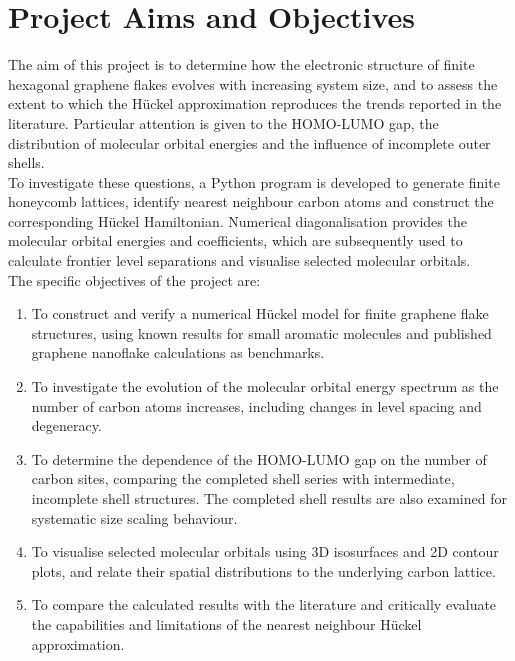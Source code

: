 \section{Project Aims and Objectives}
\label{sec:project_objectives}

\noindent The aim of this project is to determine how the electronic structure of finite hexagonal graphene flakes evolves with increasing system size, and to assess the extent to which the H\"uckel approximation reproduces the trends reported in the literature. Particular attention is given to the HOMO-LUMO gap, the distribution of molecular orbital energies and the influence of incomplete outer shells. \\

\noindent To investigate these questions, a Python program is developed to generate finite honeycomb lattices, identify nearest neighbour carbon atoms and construct the corresponding H\"uckel Hamiltonian. Numerical diagonalisation provides the molecular orbital energies and coefficients, which are subsequently used to calculate frontier level separations and visualise selected molecular orbitals. \\

\noindent The specific objectives of the project are:

\begin{enumerate}

    \item To construct and verify a numerical H\"uckel model for finite graphene flake structures, using known results for small aromatic molecules and published graphene nanoflake calculations as benchmarks.

    \item To investigate the evolution of the molecular orbital energy spectrum as the number of carbon atoms increases, including changes in level spacing and degeneracy.

    \item To determine the dependence of the HOMO-LUMO gap on the number of carbon sites, comparing the completed shell series with intermediate, incomplete shell structures. The completed shell results are also examined for systematic size scaling behaviour.

    \item To visualise selected molecular orbitals using 3D isosurfaces and 2D contour plots, and relate their spatial distributions to the underlying carbon lattice.

    \item To compare the calculated results with the literature and critically evaluate the capabilities and limitations of the nearest neighbour H\"uckel approximation.

\end{enumerate}

